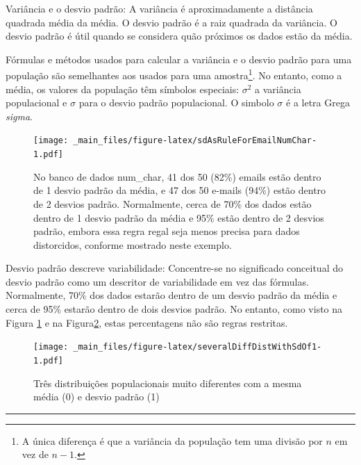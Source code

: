 \documentclass[
]{book}
\theoremstyle{definition}
\theoremstyle{definition}
\theoremstyle{definition}
\theoremstyle{definition}
\theoremstyle{remark}
\begin{document}
Variância e o desvio padrão: A variância é aproximadamente a distância quadrada média da média. O desvio padrão é a raiz quadrada da variância. O desvio padrão é útil quando se considera quão próximos os dados estão da média.

Fórmulas e métodos usados para calcular a variância e o desvio padrão para uma população são semelhantes aos usados para uma amostra\footnote{A única diferença é que a variância da população tem uma divisão por \(n\) em vez de \(n-1\).}. No entanto, como a média, os valores da população têm símbolos especiais: \(\sigma_{}^2\) a variância populacional e \(\sigma\) para o desvio padrão populacional. O simbolo \(\sigma\) é a letra Grega \emph{sigma}.

\begin{figure}
\centering
\texttt{[image: \_main\_files/figure-latex/sdAsRuleForEmailNumChar-1.pdf]}
\caption{\label{fig:sdAsRuleForEmailNumChar}No banco de dados num\_char, 41 dos 50 (82\%) emails estão dentro de 1 desvio padrão da média, e 47 dos 50 e-mails (94\%) estão dentro de 2 desvios padrão. Normalmente, cerca de 70\% dos dados estão dentro de 1 desvio padrão da média e 95\% estão dentro de 2 desvios padrão, embora essa regra regal seja menos precisa para dados distorcidos, conforme mostrado neste exemplo.}
\end{figure}

Desvio padrão descreve variabilidade: Concentre-se no significado conceitual do desvio padrão como um descritor de variabilidade em vez das fórmulas. Normalmente, 70\% dos dados estarão dentro de um desvio padrão da média e cerca de 95\% estarão dentro de dois desvios padrão. No entanto, como visto na Figura \ref{fig:sdAsRuleForEmailNumChar} e na Figura\ref{fig:severalDiffDistWithSdOf1}, estas percentagens não são regras restritas.

\begin{figure}
\centering
\texttt{[image: \_main\_files/figure-latex/severalDiffDistWithSdOf1-1.pdf]}
\caption{\label{fig:severalDiffDistWithSdOf1}Três distribuições populacionais muito diferentes com a mesma média (0) e desvio padrão (1)}
\end{figure}

\begin{center}\rule{0.5\linewidth}{0.5pt}\end{center}
\end{document}

